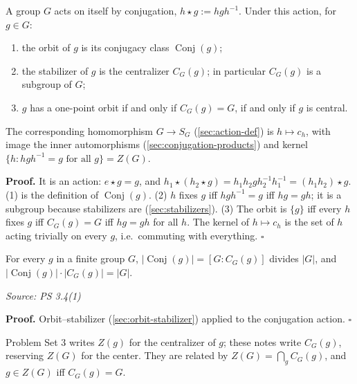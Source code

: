 \documentclass[11pt]{report}
\renewenvironment{proof}[1][Proof]{\noindent\textbf{#1.} }{\hfill$\square$\par\vspace{5pt}}
\newcommand{\srcline}[1]{\par\hfill{\footnotesize\textit{Source: #1}}}
\begin{document}
\begin{propbox}\label{prop:conjugation-action}
A group $G$ acts on itself by conjugation, $h \star g := hgh^{-1}$. Under this action, for $g \in G$:
\begin{enumerate}
    \item the orbit of $g$ is its conjugacy class $\operatorname{Conj}(g)$;
    \item the stabilizer of $g$ is the centralizer $C_G(g)$; in particular $C_G(g)$ is a subgroup of $G$;
    \item $g$ has a one-point orbit if and only if $C_G(g) = G$, if and only if $g$ is central.
\end{enumerate}
The corresponding homomorphism $G \to S_G$ (\ref{sec:action-def}) is $h \mapsto c_h$, with image the inner automorphisms (\ref{sec:conjugation-products}) and kernel $\{h : hgh^{-1} = g \text{ for all } g\} = Z(G)$.
\end{propbox}

\begin{proof}
It is an action: $e \star g = g$, and $h_1 \star (h_2 \star g) = h_1 h_2 g h_2^{-1} h_1^{-1} = (h_1h_2) \star g$. (1) is the definition of $\operatorname{Conj}(g)$. (2) $h$ fixes $g$ iff $hgh^{-1} = g$ iff $hg = gh$; it is a subgroup because stabilizers are (\ref{sec:stabilizers}). (3) The orbit is $\{g\}$ iff every $h$ fixes $g$ iff $C_G(g) = G$ iff $hg = gh$ for all $h$. The kernel of $h \mapsto c_h$ is the set of $h$ acting trivially on every $g$, i.e.\ commuting with everything.
\end{proof}

\begin{corbox}\label{cor:class-sizes-divide-group-order}
For every $g$ in a finite group $G$, $|\operatorname{Conj}(g)| = [G : C_G(g)]$ divides $|G|$, and $|\operatorname{Conj}(g)| \cdot |C_G(g)| = |G|$.
\srcline{PS 3.4(1)}
\end{corbox}

\begin{proof}
Orbit--stabilizer (\ref{sec:orbit-stabilizer}) applied to the conjugation action.
\end{proof}

\begin{rembox}\label{rem:notation-cg-g-versus-z-g}
Problem Set 3 writes $Z(g)$ for the centralizer of $g$; these notes write $C_G(g)$, reserving $Z(G)$ for the center. They are related by $Z(G) = \bigcap_{g} C_G(g)$, and $g \in Z(G)$ iff $C_G(g) = G$.
\end{rembox}
\end{document}

